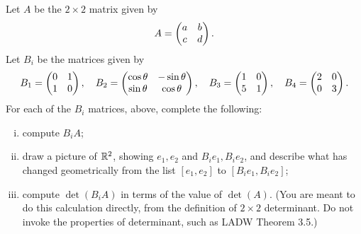 \begin{question}
    \normalfont


    Let $A$ be the $2\times2$ matrix given by
    \begin{align*}
        A = \begin{pmatrix} a &b\\ c &d \end{pmatrix}.
    \end{align*}
    Let $B_i$ be the matrices given by
    \begin{align*}
        B_1 = \begin{pmatrix} 0 &1\\ 1 &0 \end{pmatrix},\ \ \
        B_2 = \begin{pmatrix} \cos\theta &-\sin\theta\\ \sin\theta &\cos\theta \end{pmatrix},\ \ \
        B_3 = \begin{pmatrix} 1 &0\\ 5 &1 \end{pmatrix},\ \ \
        B_4 = \begin{pmatrix} 2 &0\\ 0 &3 \end{pmatrix}.
    \end{align*}
    For each of the $B_i$ matrices, above, complete the following:
    \begin{enumerate}[(i)]
        \item compute $B_iA$;
        \item draw a picture of ${\mathbb R}^2$, showing $e_1, e_2$ and $B_ie_1, B_ie_2$, and describe what has changed geometrically from the list $[e_1, e_2]$ to $[B_ie_1, B_ie_2]$;
        \item compute $\det(B_iA)$ in terms of the value of $\det(A)$.  (You are meant to do this calculation directly, from the definition of $2\times2$ determinant. Do not invoke the properties of determinant, such as LADW Theorem 3.5.)
    \end{enumerate}
\end{question}
